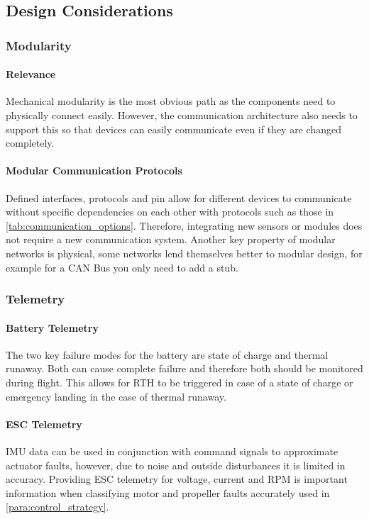 \subsection{Design Considerations}

\subsubsection{Modularity}
\paragraph{Relevance}
Mechanical modularity is the most obvious path as the components need to physically connect easily. However, the communication architecture also needs to support this so that devices can easily communicate even if they are changed completely.
\paragraph{Modular Communication Protocols}
Defined interfaces, protocols and pin allow for different devices to communicate without specific dependencies on each other with protocols such as those in \ref{tab:communication_options}. Therefore, integrating new sensors or modules does not require a new communication system. Another key property of modular networks is physical, some networks lend themselves better to modular design, for example for a \gls{CAN} Bus you only need to add a stub.

\subsubsection{Telemetry}
\paragraph{Battery Telemetry}
The two key failure modes for the battery are state of charge and thermal runaway. Both can cause complete failure and therefore both should be monitored during flight. This allows for \gls{RTH} to be triggered in case of a state of charge or emergency landing in the case of thermal runaway.
\paragraph{\gls{ESC} Telemetry}
\gls{IMU} data can be used in conjunction with command signals to approximate actuator faults, however, due to noise and outside disturbances it is limited in accuracy. Providing \gls{ESC} telemetry for voltage, current and \gls{RPM} is important information when classifying motor and propeller faults accurately used in \ref{para:control_strategy}.   

